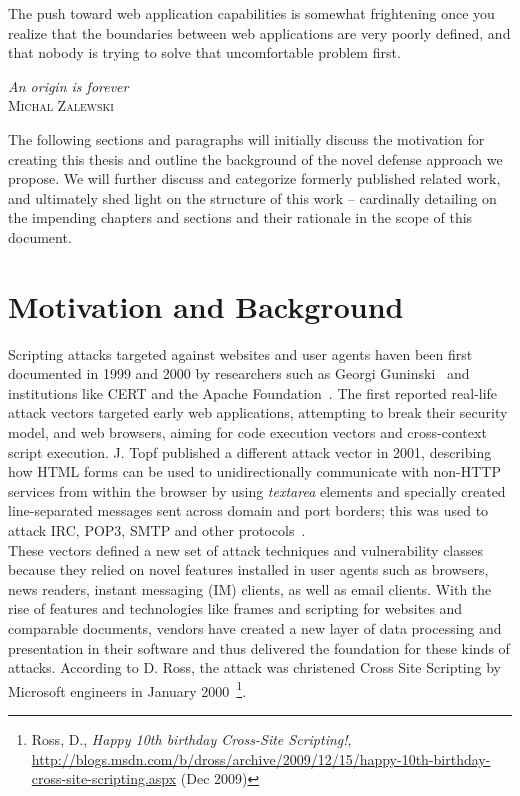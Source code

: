 \epigraph{The push toward web application capabilities is somewhat frightening once you realize that the boundaries between web applications are very poorly defined, and that nobody is trying to solve that uncomfortable problem first.}%
{\textit{An origin is forever}\\ \textsc{Michal Zalewski}}

\label{sec:1.introduction}

  The following sections and paragraphs will initially discuss the motivation for creating this thesis and outline the background of the novel defense approach we propose. We will further discuss and categorize formerly published related work, and ultimately shed light on the structure of this work -- cardinally detailing on the impending chapters and sections and their rationale in the scope of this document.

  \section{Motivation and Background}
  \label{subsec:1.2.motivation_and_background}

  Scripting attacks targeted against websites and user agents haven been first documented in 1999 and 2000 by researchers such as Georgi Guninski~\cite{guninski_ie_1999,guninski_ie_1999-1,guninski_iis_2000} and institutions like CERT and the Apache Foundation~\cite{apache_foundation_cross_2000,carnegie_mellon_university_cert_2000}. The first reported real-life attack vectors targeted early web applications, attempting to break their security model, and web browsers, aiming for code execution vectors and cross-context script execution. J. Topf published a different attack vector in 2001, describing how HTML forms can be used to unidirectionally communicate with non-HTTP services from within the browser by using \textit{textarea} elements and specially created line-separated messages sent across domain and port borders; this was used to attack IRC, POP3, SMTP and other protocols~\cite{topf2001html}.\\

  These vectors defined a new set of attack techniques and vulnerability classes because they relied on novel features installed in user agents such as browsers, news readers, instant messaging (IM) clients, as well as email clients. With the rise of features and technologies like frames and scripting for websites and comparable documents, vendors have created a new layer of data processing and presentation in their software and thus delivered the foundation for these kinds of attacks. According to D. Ross, the attack was christened Cross Site Scripting by Microsoft engineers in January 2000~\footnote{Ross, D., \textit{Happy 10th birthday Cross-Site Scripting!}, \url{http://blogs.msdn.com/b/dross/archive/2009/12/15/happy-10th-birthday-cross-site-scripting.aspx} (Dec 2009)}.\\


